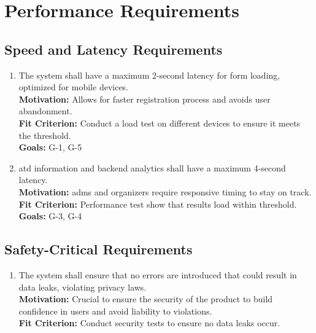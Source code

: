 \documentclass[12pt]{article}
\begin{document}
\section{Performance Requirements}
\subsection{Speed and Latency Requirements}
\begin{enumerate}[label=\bfseries SL-\arabic*:, wide=0pt, leftmargin=*, ref=\bfseries SL-\arabic*]
  \item \label{SL1} The system shall have a maximum 2-second latency for form loading, optimized for mobile devices.\\
  {\bf Motivation:} Allows for faster registration process and avoids user abandonment.\\
  {\bf Fit Criterion:} Conduct a load test on different devices to ensure it meets the threshold.\\
  {\bf Goals:} G-1, G-5
  \item \label{SL2} \Gls{atd} information and backend analytics shall have a maximum 4-second latency.\\
  {\bf Motivation:} \Glspl{adm} and organizers require responsive timing to stay on track.\\
  {\bf Fit Criterion:} Performance test show that results load within threshold.\\
  {\bf Goals:} G-3, G-4
\end{enumerate}

\subsection{Safety-Critical Requirements}
\begin{enumerate}[label=\bfseries SC-\arabic*:, wide=0pt, leftmargin=*, ref=\bfseries SC-\arabic*]
  \item \label{SC1} The system shall ensure that no errors are introduced that could result in data leaks, violating privacy laws.\\
  {\bf Motivation:} Crucial to ensure the security of the product to build confidence in users and avoid liability to violations.\\
  {\bf Fit Criterion:} Conduct security tests to ensure no data leaks occur.
\end{enumerate}
\end{document}
